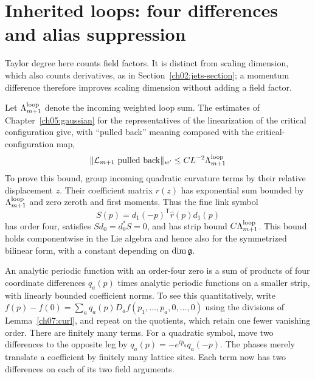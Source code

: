 \section{Inherited loops: four differences and alias suppression}

Taylor degree here counts field factors. It is distinct from scaling dimension, which also counts derivatives, as in Section~\ref{ch02:jets-section}; a momentum difference therefore improves scaling dimension without adding a field factor.
\label{ch07:inherited-proof}

Let $\Lambda_{m+1}^{\rm loop}$ denote the incoming weighted loop sum.
The estimates of Chapter~\ref{ch05:gaussian} for the representatives of the linearization of the critical configuration give, with ``pulled back'' meaning composed with the critical-configuration map,
\begin{equation}\label{ch07:inherited}
 \|\mathcal L_{m+1}\hbox{ pulled back}\|_{w'}
 \le C L^{-2}\Lambda_{m+1}^{\rm loop}
\end{equation}
To prove this bound, group incoming quadratic curvature terms by their relative displacement
$z$. Their coefficient matrix $r(z)$ has exponential sum bounded by
$\Lambda_{m+1}^{\rm loop}$ and zero zeroth and first moments. Thus the
fine link symbol
\[
 S(p)=d_1(-p)^{\mathsf T}\widehat r(p)d_1(p)
\]
has order four, satisfies $S d_0=d_0^*S=0$, and has strip bound
$C\Lambda_{m+1}^{\rm loop}$. This bound holds componentwise in the
Lie algebra and hence also for the symmetrized bilinear form, with a
constant depending on $\dim\mathfrak g$.

An analytic periodic function with an order-four zero is a sum of
products of four coordinate differences $q_a(p)$ times analytic periodic
functions on a smaller strip, with linearly bounded coefficient norms.
To see this quantitatively, write
$f(p)-f(0)=\sum_a q_a(p)D_a f(p_1,\ldots,p_a,0,\ldots,0)$
using the divisions of Lemma~\ref{ch07:curl}, and repeat on the quotients,
which retain one fewer vanishing order. There are finitely many terms.
For a quadratic symbol, move two differences to the opposite leg by
$q_a(p)=-e^{ip_a}q_a(-p)$. The phases merely translate a coefficient
by finitely many lattice sites. Each term now has two differences on
each of its two field arguments.

